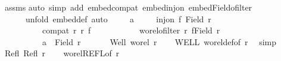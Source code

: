 \begin{isabellebody}
%
\isadelimproof
%
\endisadelimproof
%
\isatagproof
{}\isamarkupfalse%
\ assms\isanewline
{}\isamarkupfalse%
{\isacharparenleft}{\kern0pt}auto\ simp\ add{\isacharcolon}{\kern0pt}\ embed{\isacharunderscore}{\kern0pt}compat\ embed{\isacharunderscore}{\kern0pt}inj{\isacharunderscore}{\kern0pt}on\ embed{\isacharunderscore}{\kern0pt}Field{\isacharunderscore}{\kern0pt}ofilter{\isacharcomma}{\kern0pt}\isanewline
\ \ \ \ \ \ unfold\ embed{\isacharunderscore}{\kern0pt}def{\isacharcomma}{\kern0pt}\ auto{\isacharparenright}{\kern0pt}\ \isanewline
\ \ \isamarkupfalse%
\ a\isanewline
\ \ \isamarkupfalse%
\ {\isacharasterisk}{\kern0pt}{\isacharcolon}{\kern0pt}\ {\isachardoublequoteopen}inj{\isacharunderscore}{\kern0pt}on\ f\ {\isacharparenleft}{\kern0pt}Field\ r{\isacharparenright}{\kern0pt}{\isachardoublequoteclose}\ \isanewline
\ \ \ \ \ \ \ \ \ {\isacharasterisk}{\kern0pt}{\isacharasterisk}{\kern0pt}{\isacharcolon}{\kern0pt}\ {\isachardoublequoteopen}compat\ r\ r{\isacharprime}{\kern0pt}\ f{\isachardoublequoteclose}\ \isanewline
\ \ \ \ \ \ \ \ \ {\isacharasterisk}{\kern0pt}{\isacharasterisk}{\kern0pt}{\isacharasterisk}{\kern0pt}{\isacharcolon}{\kern0pt}\ {\isachardoublequoteopen}wo{\isacharunderscore}{\kern0pt}rel{\isachardot}{\kern0pt}ofilter\ r{\isacharprime}{\kern0pt}\ {\isacharparenleft}{\kern0pt}f{\isacharbackquote}{\kern0pt}{\isacharparenleft}{\kern0pt}Field\ r{\isacharparenright}{\kern0pt}{\isacharparenright}{\kern0pt}{\isachardoublequoteclose}\ \isanewline
\ \ \ \ \ \ \ \ \ {\isacharasterisk}{\kern0pt}{\isacharasterisk}{\kern0pt}{\isacharasterisk}{\kern0pt}{\isacharasterisk}{\kern0pt}{\isacharcolon}{\kern0pt}\ {\isachardoublequoteopen}a\ {\isasymin}\ Field\ r{\isachardoublequoteclose}\isanewline
\ \ \isanewline
\ \ \isamarkupfalse%
\ Well{\isacharcolon}{\kern0pt}\ {\isachardoublequoteopen}wo{\isacharunderscore}{\kern0pt}rel\ r{\isachardoublequoteclose}\isanewline
\ \ \isamarkupfalse%
\ WELL\ wo{\isacharunderscore}{\kern0pt}rel{\isacharunderscore}{\kern0pt}def{\isacharbrackleft}{\kern0pt}of\ r{\isacharbrackright}{\kern0pt}\ \isamarkupfalse%
\ simp\isanewline
\ \ \isamarkupfalse%
\ Refl{\isacharcolon}{\kern0pt}\ {\isachardoublequoteopen}Refl\ r{\isachardoublequoteclose}\isanewline
\ \ \isamarkupfalse%
\ wo{\isacharunderscore}{\kern0pt}rel{\isachardot}{\kern0pt}REFL{\isacharbrackleft}{\kern0pt}of\ r{\isacharbrackright}{\kern0pt}\ \isamarkupfalse%

\end{isabellebody}
